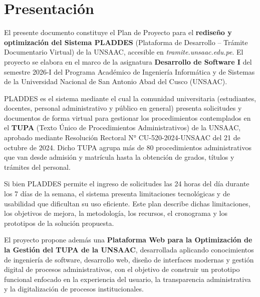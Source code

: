 \section{Presentación}
 
El presente documento constituye el Plan de Proyecto para el \textbf{rediseño y optimización del Sistema PLADDES} (Plataforma de Desarrollo -- Trámite Documentario Virtual) de la UNSAAC, accesible en \textit{tramite.unsaac.edu.pe}. El proyecto se elabora en el marco de la asignatura \textbf{Desarrollo de Software I} del semestre 2026-I del Programa Académico de Ingeniería Informática y de Sistemas de la Universidad Nacional de San Antonio Abad del Cusco (UNSAAC).
 
PLADDES es el sistema mediante el cual la comunidad universitaria (estudiantes, docentes, personal administrativo y público en general) presenta solicitudes y documentos de forma virtual para gestionar los procedimientos contemplados en el \textbf{TUPA} (Texto Único de Procedimientos Administrativos) de la UNSAAC, aprobado mediante Resolución Rectoral N° CU-520-2024-UNSAAC del 21 de octubre de 2024. Dicho TUPA agrupa más de 80 procedimientos administrativos que van desde admisión y matrícula hasta la obtención de grados, títulos y trámites del personal.
 
Si bien PLADDES permite el ingreso de solicitudes las 24 horas del día durante los 7 días de la semana, el sistema presenta limitaciones tecnológicas y de usabilidad que dificultan su uso eficiente. Este plan describe dichas limitaciones, los objetivos de mejora, la metodología, los recursos, el cronograma y los prototipos de la solución propuesta.
 
El proyecto propone además una \textbf{Plataforma Web para la Optimización de la Gestión del TUPA de la UNSAAC}, desarrollada aplicando conocimientos de ingeniería de software, desarrollo web, diseño de interfaces modernas y gestión digital de procesos administrativos, con el objetivo de construir un prototipo funcional enfocado en la experiencia del usuario, la transparencia administrativa y la digitalización de procesos institucionales.